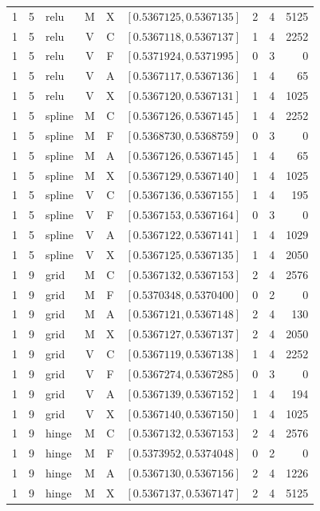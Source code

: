 \begin{longtable}{r r l c c l r r r}
1 & 5 & relu & M & X & $[0.5367125,0.5367135]$ & 2 & 4 & 5125 \\
1 & 5 & relu & V & C & $[0.5367118,0.5367137]$ & 1 & 4 & 2252 \\
1 & 5 & relu & V & F & $[0.5371924,0.5371995]$ & 0 & 3 & 0 \\
1 & 5 & relu & V & A & $[0.5367117,0.5367136]$ & 1 & 4 & 65 \\
1 & 5 & relu & V & X & $[0.5367120,0.5367131]$ & 1 & 4 & 1025 \\
1 & 5 & spline & M & C & $[0.5367126,0.5367145]$ & 1 & 4 & 2252 \\
1 & 5 & spline & M & F & $[0.5368730,0.5368759]$ & 0 & 3 & 0 \\
1 & 5 & spline & M & A & $[0.5367126,0.5367145]$ & 1 & 4 & 65 \\
1 & 5 & spline & M & X & $[0.5367129,0.5367140]$ & 1 & 4 & 1025 \\
1 & 5 & spline & V & C & $[0.5367136,0.5367155]$ & 1 & 4 & 195 \\
1 & 5 & spline & V & F & $[0.5367153,0.5367164]$ & 0 & 3 & 0 \\
1 & 5 & spline & V & A & $[0.5367122,0.5367141]$ & 1 & 4 & 1029 \\
1 & 5 & spline & V & X & $[0.5367125,0.5367135]$ & 1 & 4 & 2050 \\
1 & 9 & grid & M & C & $[0.5367132,0.5367153]$ & 2 & 4 & 2576 \\
1 & 9 & grid & M & F & $[0.5370348,0.5370400]$ & 0 & 2 & 0 \\
1 & 9 & grid & M & A & $[0.5367121,0.5367148]$ & 2 & 4 & 130 \\
1 & 9 & grid & M & X & $[0.5367127,0.5367137]$ & 2 & 4 & 2050 \\
1 & 9 & grid & V & C & $[0.5367119,0.5367138]$ & 1 & 4 & 2252 \\
1 & 9 & grid & V & F & $[0.5367274,0.5367285]$ & 0 & 3 & 0 \\
1 & 9 & grid & V & A & $[0.5367139,0.5367152]$ & 1 & 4 & 194 \\
1 & 9 & grid & V & X & $[0.5367140,0.5367150]$ & 1 & 4 & 1025 \\
1 & 9 & hinge & M & C & $[0.5367132,0.5367153]$ & 2 & 4 & 2576 \\
1 & 9 & hinge & M & F & $[0.5373952,0.5374048]$ & 0 & 2 & 0 \\
1 & 9 & hinge & M & A & $[0.5367130,0.5367156]$ & 2 & 4 & 1226 \\
1 & 9 & hinge & M & X & $[0.5367137,0.5367147]$ & 2 & 4 & 5125 \\

\end{longtable}
